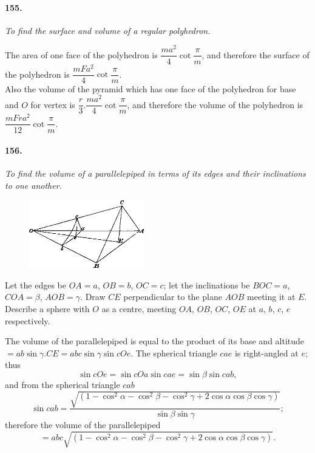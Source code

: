\documentclass{book}[2004/02/16]
\providecommand{\centerdot}{.}
\begin{document}
\begin{mainmatter}
\begin{spacing}{1.3}
\paragraph{155.} \textit{To find the surface and volume of a regular polyhedron.}

The area of one face of the polyhedron is $\dfrac{ma^2}{4}\cot{\dfrac{\pi}{m}}$, and
therefore the surface of the polyhedron is $\dfrac{mFa^2}{4}\cot{\dfrac{\pi}{m}}$.\\[.5ex]

Also the volume of the pyramid which has one face of the
polyhedron for base and $O$ for vertex is $\dfrac{r}{3}\centerdot\dfrac{ma^2}{4}\cot{\dfrac{\pi}{m}}$, and
therefore the volume of the polyhedron is $\dfrac{mFra^2}{12}\cot{\dfrac{\pi}{m}}$.\\[.5ex]

\paragraph{156.} \textit{To find the volume of a parallelepiped in terms of its
edges and their inclinations to one another.}
\begin{figure}[htp]
\centering
\includegraphics[width=5.0cm]{images/128fc}
\end{figure}

Let the edges be $OA=a$, $OB=b$, $OC=c$; let the inclinations
be $BOC=a$, $COA=\beta$, $AOB=\gamma$. Draw $CE$ perpendicular to the
plane $AOB$ meeting it at $E$. Describe a sphere with $O$ as a
centre, meeting $OA$, $OB$, $OC$, $OE$ at $a$, $b$, $c$, $e$ respectively.

The volume of the parallelepiped is equal to the product of its
base and altitude $=ab\sin{\gamma}\centerdot CE=abc\sin{\gamma}\sin{cOe}$. The spherical
triangle $cae$ is right-angled at $e$; thus
\[
\sin{cOe}=\sin{cOa}\sin{cae}=\sin{\beta}\sin{cab},
\]
and from the spherical triangle $cab$
\[
\sin{cab}
= \frac{\surd{( 1 - \cos^2{\alpha} - \cos^2{\beta} - \cos^2{\gamma}
              + 2\cos{\alpha}\cos{\beta}\cos{\gamma} )} }
       {\sin{\beta}\sin{\gamma} };
\]
therefore the volume of the parallelepiped
\[
= abc\surd{( 1 - \cos^2{\alpha} - \cos^2{\beta} - \cos^2{\gamma}
           + 2\cos{\alpha} \cos{\beta} \cos{\gamma} )}.
\]


\end{spacing}
\end{mainmatter}
\end{document}
